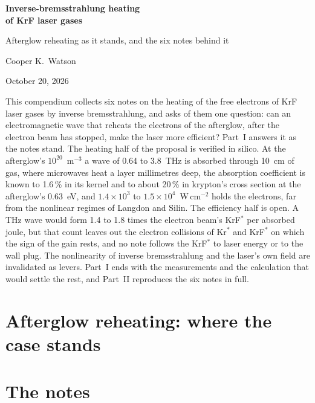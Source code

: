 \documentclass[11pt]{report}
\begin{document}
\begin{titlepage}
\centering
\vspace*{2cm}
{\LARGE\bfseries Inverse-bremsstrahlung heating\\[4pt] of KrF laser gases\par}
\vspace{0.8cm}
{\large Afterglow reheating as it stands, and the six notes behind it\par}
\vspace{1.2cm}
{\large Cooper K.\ Watson\par}
\vspace{0.4cm}
{\large October 20, 2026\par}
\vspace{1.6cm}
\begin{minipage}{0.86\textwidth}
\small
\noindent This compendium collects six notes on the heating of the free electrons of KrF
laser gases by inverse bremsstrahlung, and asks of them one question: can an
electromagnetic wave that reheats the electrons of the afterglow, after the electron beam
has stopped, make the laser more efficient? Part~I answers it as the notes stand. The
heating half of the proposal is verified in silico. At the afterglow's
$10^{20}$~m$^{-3}$ a wave of 0.64 to 3.8~THz is absorbed through 10~cm of gas, where
microwaves heat a layer millimetres deep, the absorption coefficient is known to 1.6\,\%
in its kernel and to about 20\,\% in krypton's cross section at the afterglow's
0.63~eV, and $1.4\times10^{3}$ to $1.5\times10^{4}$~W\,cm$^{-2}$ holds the electrons, far
from the nonlinear regimes of Langdon and Silin. The efficiency half is open. A THz wave
would form 1.4 to 1.8 times the electron beam's KrF$^*$ per absorbed joule, but that
count leaves out the electron collisions of Kr$^*$ and KrF$^*$ on which the sign of the
gain rests, and no note follows the KrF$^*$ to laser energy or to the wall plug. The
nonlinearity of inverse bremsstrahlung and the laser's own field are invalidated as
levers. Part~I ends with the measurements and the calculation that would settle the
rest, and Part~II reproduces the six notes in full.
\end{minipage}
\end{titlepage}
\tableofcontents
\clearpage
{}

\part{Afterglow reheating: where the case stands}\label{p1:part:case}


\part{The notes}\label{p1:part:notes}






\end{document}
